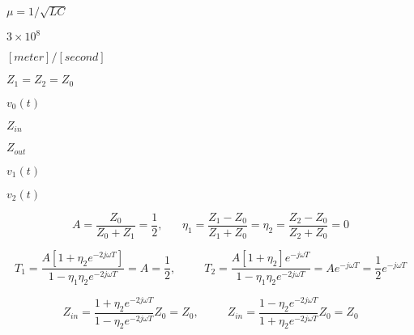 {\newpage\clearpage
{}%
$\mu=1/\sqrt{LC}$%
\lthtmlinlinemathZ
\lthtmlcheckvsize\clearpage}

{\newpage\clearpage
{}%
$3\times 10^8$%
\lthtmlinlinemathZ
\lthtmlcheckvsize\clearpage}

{\newpage\clearpage
{}%
$[meter]/[second]$%
\lthtmlinlinemathZ
\lthtmlcheckvsize\clearpage}

{\newpage\clearpage
{}%
$Z_1=Z_2=Z_0$%
\lthtmlinlinemathZ
\lthtmlcheckvsize\clearpage}

{\newpage\clearpage
{}%
$v_0(t)$%
\lthtmlinlinemathZ
\lthtmlcheckvsize\clearpage}

{\newpage\clearpage
{}%
$Z_{in}$%
\lthtmlinlinemathZ
\lthtmlcheckvsize\clearpage}

{\newpage\clearpage
{}%
$Z_{out}$%
\lthtmlinlinemathZ
\lthtmlcheckvsize\clearpage}

{\newpage\clearpage
{}%
$v_1(t)$%
\lthtmlinlinemathZ
\lthtmlcheckvsize\clearpage}

{\newpage\clearpage
{}%
$v_2(t)$%
\lthtmlinlinemathZ
\lthtmlcheckvsize\clearpage}

{\newpage\clearpage
{}%
\begin{displaymath} A=\frac{Z_0}{Z_0+Z_1}=\frac{1}{2},\;\;\;\;\;\;
  \eta_1=\frac{Z_1-Z_0}{Z_1+Z_0}=\eta_2=\frac{Z_2-Z_0}{Z_2+Z_0}=0 \end{displaymath}%
\lthtmldisplayZ
\lthtmlcheckvsize\clearpage}

{\newpage\clearpage
{}%
\begin{displaymath} T_1=\frac{A[1+\eta_2e^{-2j\omega T}]}{1-\eta_1\eta_2e^{-2j\omega T}}=A=\frac{1}{2},
  \;\;\;\;\;\;\;\;\;T_2=\frac{A[1+\eta_2]e^{-j\omega T}}{1-\eta_1\eta_2e^{-2j\omega T}}
  =Ae^{-j\omega T}=\frac{1}{2}e^{-j\omega T}	\end{displaymath}%
\lthtmldisplayZ
\lthtmlcheckvsize\clearpage}

{\newpage\clearpage
{}%
\begin{displaymath} Z_{in}=\frac{1+\eta_2e^{-2j\omega T}}{1-\eta_2e^{-2j\omega T}}Z_0=Z_0,
  \;\;\;\;\;\;\;\;\;
  Z_{in}=\frac{1-\eta_2e^{-2j\omega T}}{1+\eta_2e^{-2j\omega T}}Z_0=Z_0 \end{displaymath}%
\lthtmldisplayZ
\lthtmlcheckvsize\clearpage}

